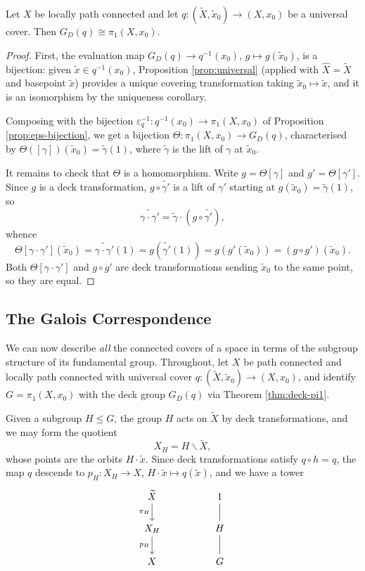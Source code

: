 \documentclass[a4paper]{scrartcl}
\begin{document}
\begin{theorem} \label{thm:deck-pi1}
	Let $X$ be locally path connected and let $q: (\widetilde X, \tilde x_0) \to (X, x_0)$ be a universal cover. Then $G_D(q) \cong \pi_1(X, x_0)$.
\end{theorem}
\begin{proof}
	First, the evaluation map $G_D(q) \to q^{-1}(x_0)$, $g \mapsto g(\tilde x_0)$, is a bijection: given $\tilde x \in q^{-1}(x_0)$, Proposition \ref{prop:universal} (applied with $\hat X = \widetilde X$ and basepoint $\tilde x$) provides a unique covering transformation taking $\tilde x_0 \mapsto \tilde x$, and it is an isomorphism by the uniqueness corollary.

	Composing with the bijection $\varepsilon_q^{-1}: q^{-1}(x_0) \to \pi_1(X,x_0)$ of Proposition \ref{prop:eps-bijection}, we get a bijection $\Theta: \pi_1(X, x_0) \to G_D(q)$, characterised by $\Theta([\gamma])(\tilde x_0) = \tilde\gamma(1)$, where $\tilde\gamma$ is the lift of $\gamma$ at $\tilde x_0$.

	It remains to check that $\Theta$ is a homomorphism. Write $g = \Theta[\gamma]$ and $g' = \Theta[\gamma']$. Since $g$ is a deck transformation, $g \circ \tilde{\gamma'}$ is a lift of $\gamma'$ starting at $g(\tilde x_0) = \tilde\gamma(1)$, so
	$$
	\widetilde{\gamma\cdot\gamma'} = \tilde\gamma \cdot (g \circ \tilde{\gamma'}),
	$$
	whence
	$$
	\Theta[\gamma\cdot\gamma'](\tilde x_0) = \widetilde{\gamma\cdot\gamma'}(1) = g(\tilde{\gamma'}(1)) = g(g'(\tilde x_0)) = (g \circ g')(\tilde x_0).
	$$
	Both $\Theta[\gamma\cdot\gamma']$ and $g \circ g'$ are deck transformations sending $\tilde x_0$ to the same point, so they are equal.
\end{proof}

\subsection{The Galois Correspondence}

We can now describe \emph{all} the connected covers of a space in terms of the subgroup
structure of its fundamental group. Throughout, let $X$ be path connected and locally
path connected with universal cover $q: (\widetilde X, \tilde x_0) \to (X, x_0)$, and
identify $G = \pi_1(X, x_0)$ with the deck group $G_D(q)$ via Theorem \ref{thm:deck-pi1}.

Given a subgroup $H \leq G$, the group $H$ acts on $\widetilde X$ by deck transformations,
and we may form the quotient
$$
X_H = H \backslash \widetilde X,
$$
whose points are the orbits $H \cdot \tilde x$. Since deck transformations satisfy
$q \circ h = q$, the map $q$ descends to $p_H: X_H \to X$, $H\cdot\tilde x \mapsto q(\tilde x)$,
and we have a tower
\[\begin{tikzcd}
	{\widetilde X} \arrow[d, "{\pi_H}"'] & & 1 \arrow[d, no head] \\
	{X_H} \arrow[d, "{p_H}"'] & & H \arrow[d, no head] \\
	X & & G
\end{tikzcd}\]
\end{document}
